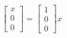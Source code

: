\documentclass[preview]{standalone}
\begin{document}
$$\begin{bmatrix}x\\0\\0\end{bmatrix} = \begin{bmatrix}1\\0\\0\end{bmatrix} x$$
\end{document}
